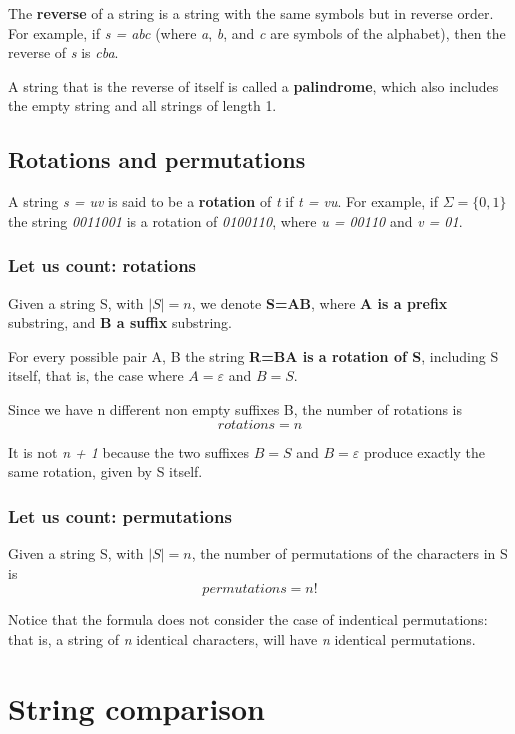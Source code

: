 \documentclass[12pt, letterpaper]{article}
\begin{document}
The \textbf{reverse} of a string is a string with the same symbols but in reverse order. For example, if \emph{s = abc} (where \emph{a}, \emph{b}, and \emph{c} are symbols of the alphabet), then the reverse of \emph{s} is \emph{cba}.

A string that is the reverse of itself is called a \textbf{palindrome}, which also includes the empty string and all strings of length 1.

\subsection{Rotations and permutations}

A string \emph{s = uv} is said to be a \textbf{rotation} of \emph{t} if \emph{t = vu}. For example, if $\Sigma = \{0, 1\}$ the string \emph{0011001} is a rotation of \emph{0100110}, where \emph{u = 00110} and \emph{v = 01}.

\subsubsection{Let us count: rotations}
Given a string S, with $|S| = n$, we denote \textbf{S=AB}, where \textbf{A is a prefix} substring, and \textbf{B a suffix} substring.

For every possible pair A, B the string \textbf{R=BA is a rotation of S}, including S itself, that is, the case where $A=\varepsilon$ and $B=S$.

Since we have n different non empty suffixes B, the number of rotations is
$$
rotations = n
$$

It is not \emph{n + 1} because the two suffixes $B=S$ and $B=\varepsilon$ produce exactly the same rotation, given by S itself.

\subsubsection{Let us count: permutations}

Given a string S, with $|S| = n$, the number of permutations of the characters in S is
$$
permutations = n!
$$

Notice that the formula does not consider the case of indentical permutations: that is, a string of \emph{n} identical characters, will have \emph{n} identical permutations.

\section{String comparison}
\end{document}

